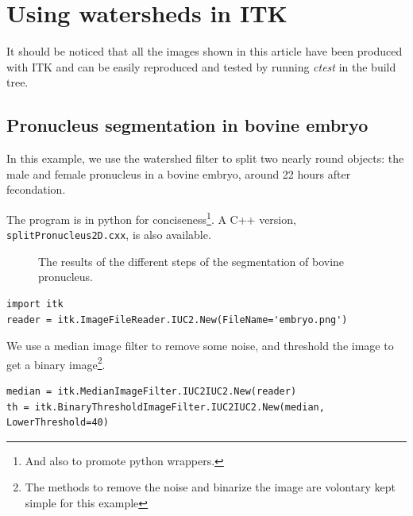 \documentclass{InsightArticle}
\begin{document}
\section{Using watersheds in ITK}
\label{sect:using-ws-itk}

It should be noticed that all the images shown in this article have been
produced with ITK and can be easily reproduced and tested by running 
{\em ctest} in the build tree.

\subsection{Pronucleus segmentation in bovine embryo}
\label{sect:pronucleus}
In this example, we use the watershed filter to split two nearly round
objects: the male and female pronucleus in a bovine embryo, around 22
hours after fecondation.

The program is in python for conciseness\footnote{And also to promote
python wrappers.}. A C++ version, \verb$splitPronucleus2D.cxx$, is also
available.

\begin{figure}[htbp]
\begin{center}

\caption{The results of the different steps of the segmentation of bovine pronucleus.}
\end{center}
\end{figure}

\small \begin{verbatim}
import itk
reader = itk.ImageFileReader.IUC2.New(FileName='embryo.png')
\end{verbatim} \normalsize

We use a median image filter to remove some noise, and threshold the image
to get a binary image\footnote{The methods to remove the noise and binarize the
image are volontary kept simple for this example}.

\small \begin{verbatim}
median = itk.MedianImageFilter.IUC2IUC2.New(reader)
th = itk.BinaryThresholdImageFilter.IUC2IUC2.New(median, LowerThreshold=40)
\end{verbatim} \normalsize
\end{document}

